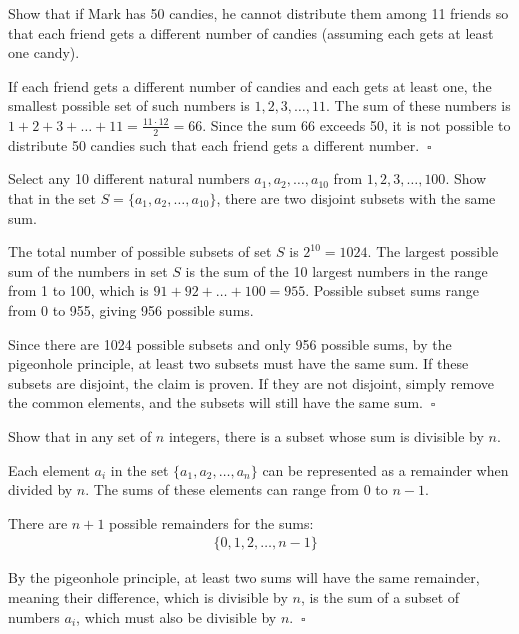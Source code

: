 \documentclass[a4paper,10pt]{article}
\begin{document}
\begin{problem}
	Show that if Mark has 50 candies, he cannot distribute them among 11 friends so that each friend gets a different number of candies (assuming each gets at least one candy).

	If each friend gets a different number of candies and each gets at least one, the smallest possible set of such numbers is \( 1, 2, 3, \dots, 11 \). The sum of these numbers is \( 1 + 2 + 3 + \dots + 11 = \frac{11 \cdot 12}{2} = 66 \). Since the sum 66 exceeds 50, it is not possible to distribute 50 candies such that each friend gets a different number. \(\ \square \)
\end{problem}

\begin{problem}
	Select any 10 different natural numbers \( a_1, a_2, \ldots, a_{10} \) from \( 1, 2, 3, \ldots, 100 \). Show that in the set \( S = \{ a_1, a_2, \ldots, a_{10} \} \), there are two disjoint subsets with the same sum.

	The total number of possible subsets of set \( S \) is \( 2^{10} = 1024 \). The largest possible sum of the numbers in set \( S \) is the sum of the 10 largest numbers in the range from 1 to 100, which is \( 91 + 92 + \ldots + 100 = 955 \). Possible subset sums range from 0 to 955, giving 956 possible sums.

	Since there are 1024 possible subsets and only 956 possible sums, by the pigeonhole principle, at least two subsets must have the same sum. If these subsets are disjoint, the claim is proven. If they are not disjoint, simply remove the common elements, and the subsets will still have the same sum. \(\ \square \)
\end{problem}

\begin{problem}
	Show that in any set of \( n \) integers, there is a subset whose sum is divisible by \( n \).
	
	Each element \( a_i \) in the set \( \{ a_1, a_2, \ldots, a_n \} \) can be represented as a remainder when divided by \( n \). The sums of these elements can range from \( 0 \) to \( n-1 \). 
	
	There are \( n+1 \) possible remainders for the sums:
	\[
		\begin{aligned}
			&\{ 0, 1, 2, \ldots, n-1 \}
		\end{aligned}
	\]
	
	By the pigeonhole principle, at least two sums will have the same remainder, meaning their difference, which is divisible by \( n \), is the sum of a subset of numbers \( a_i \), which must also be divisible by \( n \). \(\ \square \)
\end{problem}
\end{document}

